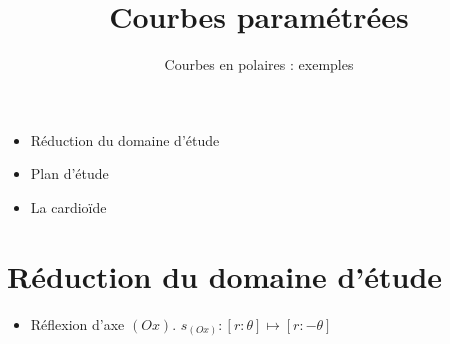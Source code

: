 

   





\title{{\bf Courbes paramétrées}}
\subtitle{Courbes en polaires : exemples}

\begin{frame}
  
  \debutmontitre

  \pause

{\footnotesize
\hfill
{}
\begin{minipage}{0.6\textwidth}
  \begin{itemize}
    \item<3-> Réduction du domaine d'étude
    \item<4-> Plan d'étude
    \item<5-> La cardioïde  
  \end{itemize}
\end{minipage}
}

\end{frame}

\setcounter{framenumber}{0}



\section{Réduction du domaine d'étude}

\begin{frame}
\begin{itemize}
  \item Réflexion d'axe $(Ox)$. $s_{(Ox)} : [r:\theta] \mapsto [r:-\theta]$
 






   
\end{itemize}





\end{frame}


